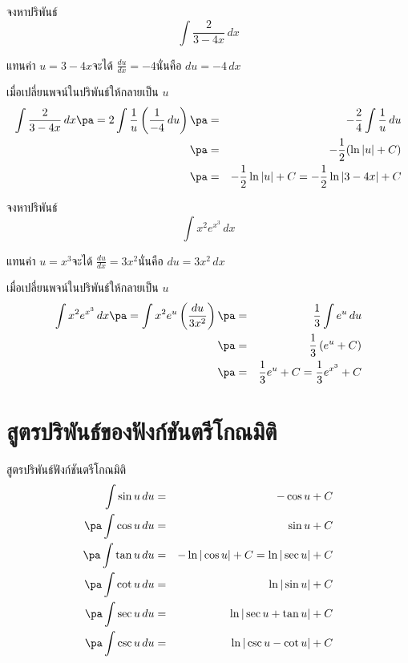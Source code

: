 \begin{frame}[t]
\begin{ex}
จงหาปริพันธ์
\[\int \frac{2}{3-4x} \,dx\]
\end{ex}
\begin{sol}
แทนค่า $u = 3-4x$\pa จะได้ $\frac{du}{dx} = -4$\pa นั่นคือ $du = -4\, dx$ \pa

เมื่อเปลี่ยนพจน์ในปริพันธ์ให้กลายเป็น $u$ \pa
\begin{eqnarray*}
\int \frac{2}{3-4x} \, dx \pa = 2\int \frac{1}{u} \left( \frac{1}{-4} \, du \right) \pa &=& -\frac{2}{4} \int \frac{1}{u} \, du \\
\pa &=& -\frac{1}{2} (\ln |u| + C) \\
\pa &=& -\frac{1}{2} \ln |u| + C = -\frac{1}{2} \ln|3-4x| + C
\end{eqnarray*}
\end{sol}
\end{frame}


\begin{frame}[t]
\begin{ex}
จงหาปริพันธ์
\[\int x^2e^{x^3} \,dx\]
\end{ex}
\begin{sol}
แทนค่า $u = x^3$\pa จะได้ $\frac{du}{dx} = 3x^2$\pa นั่นคือ $du = 3x^2\, dx$ \pa

เมื่อเปลี่ยนพจน์ในปริพันธ์ให้กลายเป็น $u$ \pa
\begin{eqnarray*}
\int x^2e^{x^3} \, dx \pa = \int x^2 e^u \left( \frac{du}{3x^2} \right) \pa &=& \frac{1}{3} \int e^u \, du \\
\pa &=& \frac{1}{3} \left( e^u + C \right) \\
\pa &=& \frac{1}{3} e^u + C = \frac{1}{3}e^{x^3} + C
\end{eqnarray*}
\end{sol}
\end{frame}


\section[ตรีโกณมิติ]{สูตรปริพันธ์ของฟังก์ชันตรีโกณมิติ}
\frame{\sectionpage}

\begin{frame}
\begin{thm}{สูตรปริพันธ์ฟังก์ชันตรีโกณมิติ}{}
\begin{eqnarray*}
\int \sin u \, du &=& - \cos u + C \\ \pa
\int \cos u \, du &=& \sin u + C \\ \pa
\int \tan u \, du &=& - \ln | \cos u| + C = \ln | \sec u| + C\\ \pa 
\int \cot u \, du &=& \ln | \sin u | + C\\ \pa 
\int \sec u \, du &=& \ln | \sec u + \tan u | + C \\ \pa 
\int \csc u \, du &=& \ln | \csc u - \cot u| + C
\end{eqnarray*}
\end{thm}
\end{frame}


